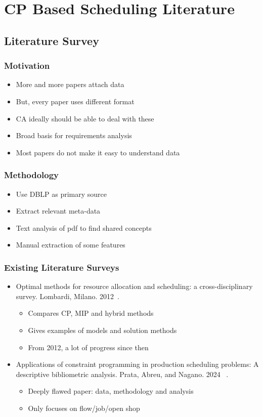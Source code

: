 \documentclass[dvipsnames,aspectratio=169]{beamer}
\begin{document}
\section{CP Based Scheduling Literature}

\subsection{Literature Survey}

\begin{frame}
\frametitle{Motivation}
\begin{itemize}
\item More and more papers attach data
\item But, every paper uses different format
\item CA ideally should be able to deal with these
\item Broad basis for requirements analysis
\item Most papers do not make it easy to understand data
\end{itemize}
\end{frame}

\begin{frame}
\frametitle{Methodology}
\begin{itemize}
\item Use DBLP as primary source
\item Extract relevant meta-data
\item Text analysis of pdf to find shared concepts
\item Manual extraction of some features
\end{itemize}
\end{frame}

\begin{frame}
\frametitle{Existing Literature Surveys}
\begin{itemize}
\item Optimal methods for resource allocation and scheduling: a cross-disciplinary survey. Lombardi, Milano. 2012~\cite{LombardiM12}.
\begin{itemize}
\item Compares CP, MIP and hybrid methods
\item Gives examples of models and solution methods
\item From 2012, a lot of progress since then
\end{itemize}
\item Applications of constraint programming in production scheduling problems: A descriptive bibliometric analysis. Prata, Abreu, and Nagano. 2024~ \cite{PrataAN23}.
\begin{itemize}
\item Deeply flawed paper: data, methodology and analysis
\item Only focuses on flow/job/open shop
\end{itemize}
\end{itemize}
\end{frame}
\end{document}
